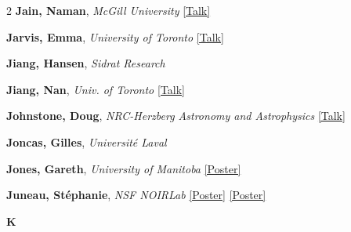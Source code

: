 \begin{small}
\begin{multicols}{2}
\textbf{Jain, Naman}, {\footnotesize\textit{McGill University}} \hyperref[abstract-page-talk-33]{\scriptsize\textcolor{cascablue}{[Talk]}}\par
\textbf{Jarvis, Emma}, {\footnotesize\textit{University of Toronto}} \hyperref[abstract-page-talk-154]{\scriptsize\textcolor{cascablue}{[Talk]}}\par
\textbf{Jiang, Hansen}, {\footnotesize\textit{Sidrat Research}}\par
\textbf{Jiang, Nan}, {\footnotesize\textit{Univ. of Toronto}} \hyperref[abstract-page-talk-269]{\scriptsize\textcolor{cascablue}{[Talk]}}\par
\textbf{Johnstone, Doug}, {\footnotesize\textit{NRC-Herzberg Astronomy and Astrophysics}} \hyperref[abstract-page-talk-76]{\scriptsize\textcolor{cascablue}{[Talk]}}\par
\textbf{Joncas, Gilles}, {\footnotesize\textit{Université Laval}}\par
\textbf{Jones, Gareth}, {\footnotesize\textit{University of Manitoba}} \hyperref[poster-abstract-page-talk-212]{\scriptsize\textcolor{cascateal}{[Poster]}}\par
\textbf{Juneau, Stéphanie}, {\footnotesize\textit{NSF NOIRLab}} \hyperref[poster-abstract-page-talk-294]{\scriptsize\textcolor{cascateal}{[Poster]}} \hyperref[poster-abstract-page-talk-334]{\scriptsize\textcolor{cascateal}{[Poster]}}\par

{\sffamily\bfseries\color{cascablue}\large K}\\[2pt]


\end{multicols}
\end{small}
